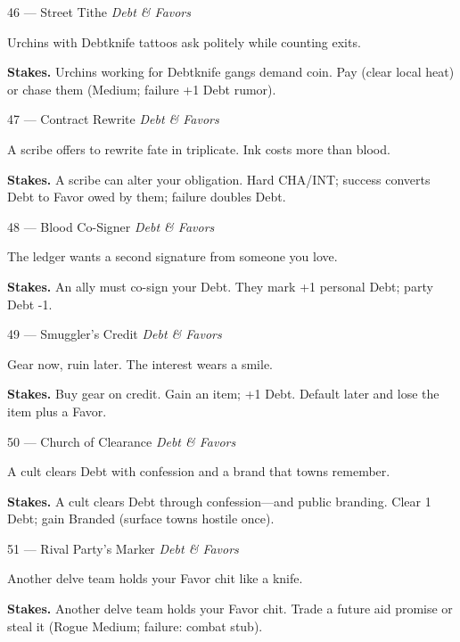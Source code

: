 \begin{encounterentry}{46 --- Street Tithe}
\textit{Debt \& Favors}

Urchins with Debtknife tattoos ask politely while counting exits.

\textbf{Stakes.} Urchins working for Debtknife gangs demand coin. Pay (clear local heat) or chase them (Medium; failure +1 Debt rumor).
\end{encounterentry}

\begin{encounterentry}{47 --- Contract Rewrite}
\textit{Debt \& Favors}

A scribe offers to rewrite fate in triplicate. Ink costs more than blood.

\textbf{Stakes.} A scribe can alter your obligation. Hard CHA/INT; success converts Debt to Favor owed by them; failure doubles Debt.
\end{encounterentry}

\begin{encounterentry}{48 --- Blood Co-Signer}
\textit{Debt \& Favors}

The ledger wants a second signature from someone you love.

\textbf{Stakes.} An ally must co-sign your Debt. They mark +1 personal Debt; party Debt -1.
\end{encounterentry}

\begin{encounterentry}{49 --- Smuggler's Credit}
\textit{Debt \& Favors}

Gear now, ruin later. The interest wears a smile.

\textbf{Stakes.} Buy gear on credit. Gain an item; +1 Debt. Default later and lose the item plus a Favor.
\end{encounterentry}

\begin{encounterentry}{50 --- Church of Clearance}
\textit{Debt \& Favors}

A cult clears Debt with confession and a brand that towns remember.

\textbf{Stakes.} A cult clears Debt through confession---and public branding. Clear 1 Debt; gain Branded (surface towns hostile once).
\end{encounterentry}

\begin{encounterentry}{51 --- Rival Party's Marker}
\textit{Debt \& Favors}

Another delve team holds your Favor chit like a knife.

\textbf{Stakes.} Another delve team holds your Favor chit. Trade a future aid promise or steal it (Rogue Medium; failure: combat stub).
\end{encounterentry}

